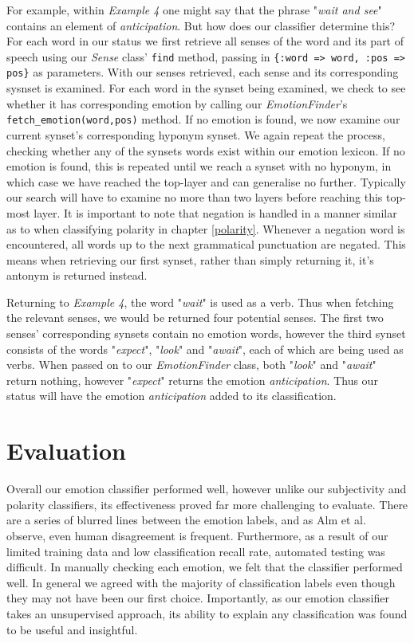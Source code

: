 For example, within \emph{Example 4} one might say that the phrase "\emph{wait and see}" contains an element of \emph{anticipation}. But how does our classifier determine this? For each word in our status we first retrieve all senses of the word and its part of speech using our \emph{Sense} class' \texttt{find} method, passing in \texttt{\{:word => word, :pos => pos\}} as parameters. With our senses retrieved, each sense and its corresponding sysnset is examined. For each word in the synset being examined, we check to see whether it has corresponding emotion by calling our \emph{EmotionFinder}'s \texttt{fetch\-\_emotion\-(word,pos)} method. If no emotion is found, we now examine our current synset's corresponding hyponym synset. We again repeat the process, checking whether any of the synsets words exist within our emotion lexicon. If no emotion is found, this is repeated until we reach a synset with no hyponym, in which case we have reached the top-layer and can generalise no further. Typically our search will have to examine no more than two layers before reaching this top-most layer. It is important to note that negation is handled in a manner similar as to when classifying polarity in chapter \ref{polarity}. Whenever a negation word is encountered, all words up to the next grammatical punctuation are negated. This means when retrieving our first synset, rather than simply returning it, it's antonym is returned instead.

Returning to \emph{Example 4}, the word "\emph{wait}" is used as a verb. Thus when fetching the relevant senses, we would be returned four potential senses. The first two senses' corresponding synsets contain no emotion words, however the third synset consists of the words "\emph{expect}", "\emph{look}" and "\emph{await}", each of which are being used as verbs. When passed on to our \emph{EmotionFinder} class, both "\emph{look}" and "\emph{await}" return nothing, however "\emph{expect}" returns the emotion \emph{anticipation}. Thus our status will have the emotion \emph{anticipation} added to its classification.

\section{Evaluation}

Overall our emotion classifier performed well, however unlike our subjectivity and polarity classifiers, its effectiveness proved far more challenging to evaluate. There are a series of blurred lines between the emotion labels, and as Alm et al. \cite{Alm:2005vc} observe, even human disagreement is frequent. Furthermore, as a result of our limited training data and low classification recall rate, automated testing was difficult. In manually checking each emotion, we felt that the classifier performed well. In general we agreed with the majority of classification labels even though they may not have been our first choice. Importantly, as our emotion classifier takes an unsupervised approach, its ability to explain any classification was found to be useful and insightful. 

